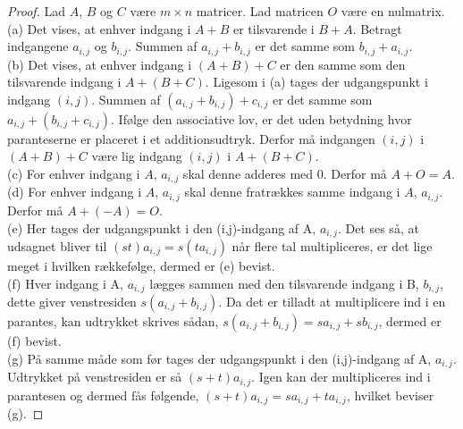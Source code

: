 \begin{proof} 
Lad $A$, $B$ og $C$ være $m \times n$ matricer. Lad matricen $O$ være en nulmatrix. \\
(a) Det vises, at enhver indgang i $A + B$ er tilsvarende i $B + A$. Betragt indgangene $a_{i,j}$ og $b_{i,j}$. Summen af $a_{i,j} + b_{i,j}$ er det samme som $b_{i,j} + a_{i,j}$. \\
(b) Det vises, at enhver indgang i $(A + B) + C$ er den samme som den tilsvarende indgang i $A + (B + C)$. Ligesom i (a) tages der udgangspunkt i indgang $(i,j)$. Summen af $(a_{i,j} + b_{i,j}) + c_{i,j}$ er det samme som $a_{i,j} + (b_{i,j} + c_{i,j})$. Ifølge den associative lov, er det uden betydning hvor paranteserne er placeret i et additionsudtryk. Derfor må indgangen $(i,j)$ i $(A + B) + C$ være lig indgang $(i,j)$ i $A + (B + C)$. \\
(c) For enhver indgang i $A$, $a_{i,j}$ skal denne adderes med $0$. Derfor må $A + O = A$. \\
(d) For enhver indgang i $A$, $a_{i,j}$ skal denne fratrækkes samme indgang i $A$, $a_{i,j}$. Derfor må $A + (-A) = O$. \\
(e) Her tages der udgangspunkt i den (i,j)-indgang af A, $a_{i,j}$. Det ses så, at udsagnet bliver til $(st)a_{i,j} = s(ta_{i,j})$ når flere tal multipliceres, er det lige meget i hvilken rækkefølge, dermed er (e) bevist. \\
(f) Hver indgang i A, $a_{i,j}$ lægges sammen med den tilsvarende indgang i B, $b_{i,j}$, dette giver venstresiden $s(a_{i,j}+b_{i,j})$. Da det er tilladt at multiplicere ind i en parantes, kan udtrykket skrives sådan, $s(a_{i,j}+b_{i,j})=sa_{i,j}+sb_{i,j}$, dermed er (f) bevist. \\
(g) På samme måde som før tages der udgangspunkt i den (i,j)-indgang af A, $a_{i,j}$. Udtrykket på venstresiden er så $(s+t)a_{i,j}$. Igen kan der multipliceres ind i parantesen og dermed fås følgende, $(s+t)a_{i,j}=sa_{i,j}+ta_{i,j}$, hvilket beviser (g).
\end{proof}

